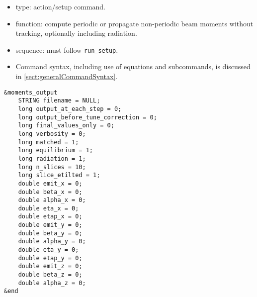 \documentclass[11pt]{article}
\begin{document}
\begin{itemize}
\item type: action/setup command.
\item function: compute periodic or propagate non-periodic beam moments without tracking, optionally including radiation.
\item sequence: must follow \verb|run_setup|.
\item Command syntax, including use of equations and subcommands, is discussed in \ref{sect:generalCommandSyntax}.
\end{itemize}

\begin{verbatim}
&moments_output
    STRING filename = NULL;
    long output_at_each_step = 0;
    long output_before_tune_correction = 0;
    long final_values_only = 0;
    long verbosity = 0;
    long matched = 1;
    long equilibrium = 1;
    long radiation = 1;
    long n_slices = 10;
    long slice_etilted = 1;
    double emit_x = 0;
    double beta_x = 0;
    double alpha_x = 0;
    double eta_x = 0;
    double etap_x = 0;
    double emit_y = 0;
    double beta_y = 0;
    double alpha_y = 0;
    double eta_y = 0;
    double etap_y = 0;
    double emit_z = 0;
    double beta_z = 0;
    double alpha_z = 0;
&end
\end{verbatim}
\end{document}

